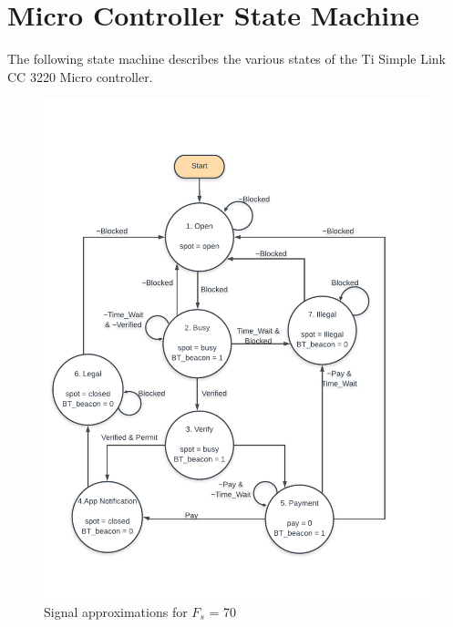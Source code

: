 \documentclass[12pt]{article}
\begin{document}
\section*{Micro Controller State Machine}
The following state machine describes the various states
of the Ti Simple Link CC 3220 Micro controller.
\begin{figure}
\center
\includegraphics[scale=0.8]{SM.pdf}
\caption{Signal approximations for $F_s$ = 70}
\end{figure}
\end{document}
